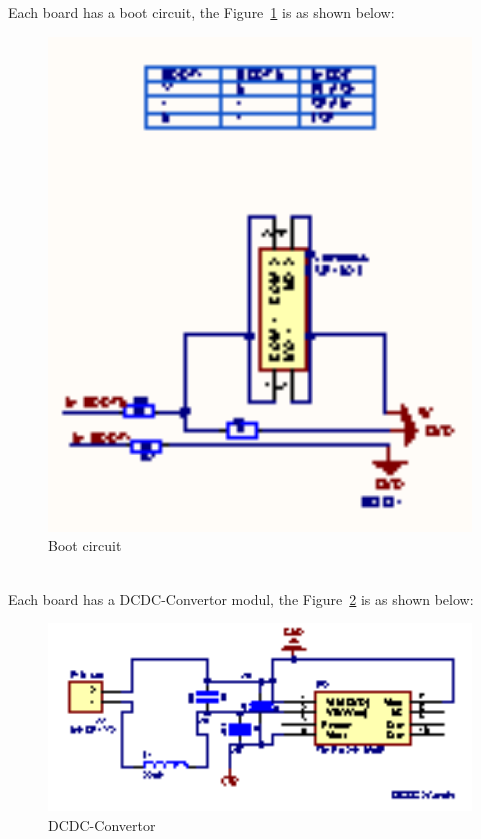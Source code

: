 Each board has a boot circuit, the Figure~\ref{fig:6.6} is as shown below:
\begin{figure}[!ht]
	\centering
	\includegraphics[width=16cm]{grafiken/boot_master.eps}
	\caption{Boot circuit} 
	\label{fig:6.6}
\end{figure}
\FloatBarrier
\\

Each board has a DCDC-Convertor modul, the Figure~\ref{fig:6.7} is as shown below:
\begin{figure}[!ht]
	\centering
	\includegraphics[width=16cm]{grafiken/dcdc.eps}
	\caption{DCDC-Convertor} 
	\label{fig:6.7}
\end{figure}
\FloatBarrier
\\

